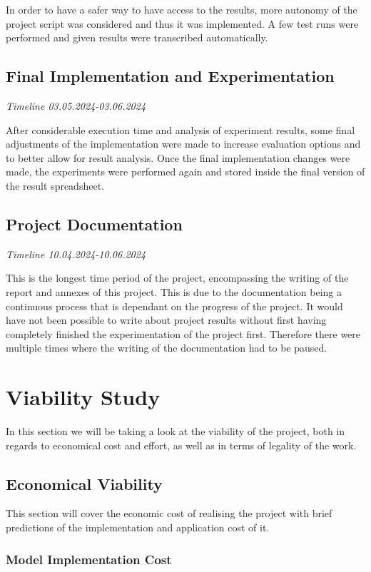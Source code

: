 In order to have a safer way to have access to the results, more autonomy of the project script was considered and thus it was implemented. A few test runs were performed and given results were transcribed automatically.

\subsection{Final Implementation and Experimentation}
\textit{Timeline 03.05.2024-03.06.2024}

After considerable execution time and analysis of experiment results, some final adjustments of the implementation were made to increase evaluation options and to better allow for result analysis. Once the final implementation changes were made, the experiments were performed again and stored inside the final version of the result spreadsheet.

\subsection{Project Documentation}
\textit{Timeline 10.04.2024-10.06.2024}

This is the longest time period of the project, encompassing the writing of the report and annexes of this project. This is due to the documentation being a continuous process that is dependant on the progress of the project. It would have not been possible to write about project results without first having completely finished the experimentation of the project first. Therefore there were multiple times where the writing of the documentation had to be paused. 

\section{Viability Study}
In this section we will be taking a look at the viability of the project, both in regards to economical cost and effort, as well as in terms of legality of the work.
\subsection{Economical Viability}
This section will cover the economic cost of realising the project with brief predictions of the implementation and application cost of it.
\subsubsection{Model Implementation Cost}

